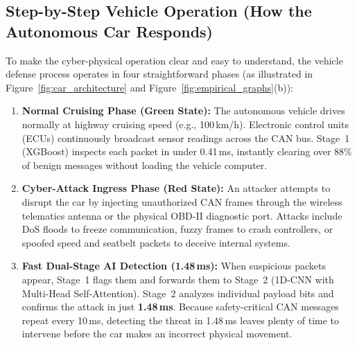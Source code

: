 \documentclass[conference]{IEEEtran}
\begin{document}
\subsection{Step-by-Step Vehicle Operation (How the Autonomous Car Responds)}
To make the cyber-physical operation clear and easy to understand, the vehicle defense process operates in four straightforward phases (as illustrated in Figure~\ref{fig:car_architecture} and Figure~\ref{fig:empirical_graphs}(b)):

\begin{enumerate}
    \item \textbf{Normal Cruising Phase (Green State):} 
    The autonomous vehicle drives normally at highway cruising speed (e.g., 100\,km/h). Electronic control units (ECUs) continuously broadcast sensor readings across the CAN bus. Stage~1 (XGBoost) inspects each packet in under 0.41\,ms, instantly clearing over 88\% of benign messages without loading the vehicle computer.

    \item \textbf{Cyber-Attack Ingress Phase (Red State):} 
    An attacker attempts to disrupt the car by injecting unauthorized CAN frames through the wireless telematics antenna or the physical OBD-II diagnostic port. Attacks include DoS floods to freeze communication, fuzzy frames to crash controllers, or spoofed speed and seatbelt packets to deceive internal systems.

    \item \textbf{Fast Dual-Stage AI Detection (1.48\,ms):} 
    When suspicious packets appear, Stage~1 flags them and forwards them to Stage~2 (1D-CNN with Multi-Head Self-Attention). Stage~2 analyzes individual payload bits and confirms the attack in just \textbf{1.48\,ms}. Because safety-critical CAN messages repeat every 10\,ms, detecting the threat in 1.48\,ms leaves plenty of time to intervene before the car makes an incorrect physical movement.


\end{enumerate}
\end{document}
